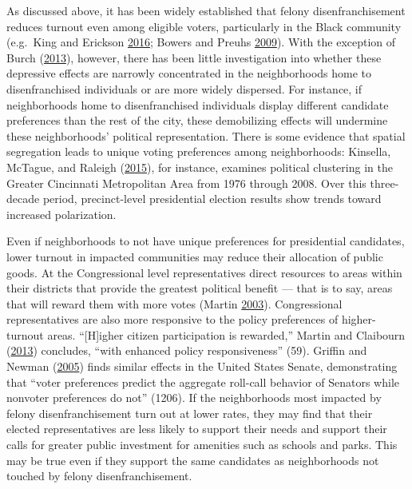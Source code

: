 \documentclass[]{article}
\begin{document}
As discussed above, it has been widely established that felony disenfranchisement reduces turnout even among eligible voters, particularly in the Black community (e.g.~King and Erickson \protect\hyperlink{ref-King2016}{2016}; Bowers and Preuhs \protect\hyperlink{ref-Bowers2009}{2009}). With the exception of Burch (\protect\hyperlink{ref-Burch2013}{2013}), however, there has been little investigation into whether these depressive effects are narrowly concentrated in the neighborhoods home to disenfranchised individuals or are more widely dispersed. For instance, if neighborhoods home to disenfranchised individuals display different candidate preferences than the rest of the city, these demobilizing effects will undermine these neighborhoods' political representation. There is some evidence that spatial segregation leads to unique voting preferences among neighborhoods: Kinsella, McTague, and Raleigh (\protect\hyperlink{ref-Kinsella2015}{2015}), for instance, examines political clustering in the Greater Cincinnati Metropolitan Area from 1976 through 2008. Over this three-decade period, precinct-level presidential election results show trends toward increased polarization.

Even if neighborhoods to not have unique preferences for presidential candidates, lower turnout in impacted communities may reduce their allocation of public goods. At the Congressional level representatives direct resources to areas within their districts that provide the greatest political benefit --- that is to say, areas that will reward them with more votes (Martin \protect\hyperlink{ref-Martin2003}{2003}). Congressional representatives are also more responsive to the policy preferences of higher-turnout areas. ``{[}H{]}igher citizen participation is rewarded,'' Martin and Claibourn (\protect\hyperlink{ref-Martin2013}{2013}) concludes, ``with enhanced policy responsiveness'' (59). Griffin and Newman (\protect\hyperlink{ref-Griffin2005}{2005}) finds similar effects in the United States Senate, demonstrating that ``voter preferences predict the aggregate roll-call behavior of Senators while nonvoter preferences do not'' (1206). If the neighborhoods most impacted by felony disenfranchisement turn out at lower rates, they may find that their elected representatives are less likely to support their needs and support their calls for greater public investment for amenities such as schools and parks. This may be true even if they support the same candidates as neighborhoods not touched by felony disenfranchisement.
\end{document}
